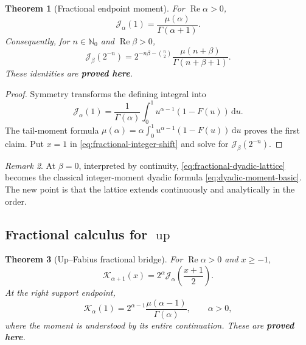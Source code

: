 \documentclass[11pt]{article}
\newcommand{\statusproved}{\textcolor{statusgreen}{\textbf{proved here}}}
\newtheorem{theorem}{Theorem}[section]
\theoremstyle{definition}
\theoremstyle{remark}
\newtheorem{remark}[theorem]{Remark}
\newcommand{\N}{\mathbb N}
\newcommand{\dd}{\,\mathrm d}
\newcommand{\Up}{\operatorname{up}}
\newcommand{\Ree}{\operatorname{Re}}
\newcommand{\J}{\mathcal J}
\newcommand{\K}{\mathcal K}
\begin{document}
\begin{theorem}[Fractional endpoint moment]
\label{thm:fractional-endpoint}
For $\Ree\alpha>0$,
\begin{equation}
 \J_\alpha(1)=\frac{\mu(\alpha)}{\Gamma(\alpha+1)}.
 \label{eq:fractional-endpoint}
\end{equation}
Consequently, for $n\in\N_0$ and $\Ree\beta>0$,
\begin{equation}
 \boxed{
 \J_\beta(2^{-n})
 =2^{-n\beta-\binom n2}
 \frac{\mu(n+\beta)}{\Gamma(n+\beta+1)}.}
 \label{eq:fractional-dyadic-lattice}
\end{equation}
These identities are \statusproved.
\end{theorem}

\begin{proof}
Symmetry transforms the defining integral into
\[
 \J_\alpha(1)=\frac1{\Gamma(\alpha)}\int_0^1u^{\alpha-1}(1-F(u))\dd u.
\]
The tail-moment formula
$\mu(\alpha)=\alpha\int_0^1u^{\alpha-1}(1-F(u))\dd u$ proves the first claim.  Put $x=1$ in
\cref{eq:fractional-integer-shift} and solve for $\J_\beta(2^{-n})$.
\end{proof}

\begin{remark}
At $\beta=0$, interpreted by continuity, \cref{eq:fractional-dyadic-lattice} becomes the
classical integer-moment dyadic formula \cref{eq:dyadic-moment-basic}.  The new point is that
the lattice extends continuously and analytically in the order.
\end{remark}

\subsection{Fractional calculus for $\Up$}

\begin{theorem}[Up--Fabius fractional bridge]
\label{thm:up-fractional-bridge}
For $\Ree\alpha>0$ and $x\ge-1$,
\begin{equation}
 \K_{\alpha+1}(x)
 =2^\alpha\J_\alpha\!\left(\frac{x+1}{2}\right).
 \label{eq:up-fractional-bridge}
\end{equation}
At the right support endpoint,
\begin{equation}
 \K_\alpha(1)
 =2^{\alpha-1}\frac{\mu(\alpha-1)}{\Gamma(\alpha)},
 \qquad \alpha>0,
 \label{eq:up-fractional-endpoint}
\end{equation}
where the moment is understood by its entire continuation.  These are \statusproved.
\end{theorem}
\end{document}
